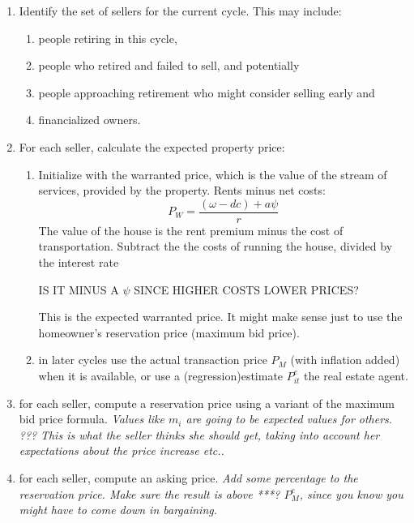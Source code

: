 \begin{enumerate}
    \item Identify the set of sellers for the current cycle. This may include:
    \begin{enumerate}
        \item people retiring in this cycle,
        \item people who retired and failed to sell, and potentially
        \item people approaching retirement who might consider selling early and
        \item financialized owners. %
    \end{enumerate}
    
    \item For each seller, calculate the expected property price: %
    \begin{enumerate}
        \item Initialize with the warranted price, which is the value of the stream of services, provided by the property. Rents minus net costs:
       \[ P_W=\frac{(\omega-{dc}) + {a}\psi}{r}\]
        The value of the house is the rent premium minus the cost of transportation. Subtract the the costs of running the house, divided by the interest rate
    
        IS IT MINUS A $\psi$ SINCE HIGHER COSTS LOWER PRICES?
       
        {\color{green} This is the expected warranted price. It might make sense just to use the homeowner's reservation price (maximum bid price)}.
        \item in later cycles use the actual transaction price $P_M$ (with inflation added) when it is available, or use a (regression)estimate $P_{it}^e$ the real estate agent.
    \end{enumerate}
    
    \item for each seller, compute a reservation price using a variant of the maximum bid price formula. 
    {\color{green}\textit{Values like $m_i$ are going to be expected values for others.  ??? }}
    \textit{This is what the seller thinks she should get, taking into account her expectations about the price increase etc..}
    
    \item for each seller, compute an asking price. 
    \textit{Add some percentage to the reservation price. Make sure the result is above ***? $P_M^e$, since you know you might have to come down in bargaining.}   
    

\end{enumerate}
